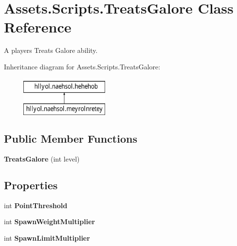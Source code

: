 \hypertarget{class_assets_1_1_scripts_1_1_treats_galore}{}\section{Assets.\+Scripts.\+Treats\+Galore Class Reference}
\label{class_assets_1_1_scripts_1_1_treats_galore}


A player\textquotesingle{}s Treats Galore ability.  


Inheritance diagram for Assets.\+Scripts.\+Treats\+Galore\+:\begin{figure}[H]
\begin{center}
\leavevmode
\includegraphics[height=2.000000cm]{class_assets_1_1_scripts_1_1_treats_galore}
\end{center}
\end{figure}
\subsection*{Public Member Functions}
\begin{DoxyCompactItemize}
\item 
{\bfseries Treats\+Galore} (int level)\hypertarget{class_assets_1_1_scripts_1_1_treats_galore_ab8b2acec90bade0247a277b8247e6511}{}\label{class_assets_1_1_scripts_1_1_treats_galore_ab8b2acec90bade0247a277b8247e6511}

\end{DoxyCompactItemize}
\subsection*{Properties}
\begin{DoxyCompactItemize}
\item 
int {\bfseries Point\+Threshold}\hypertarget{class_assets_1_1_scripts_1_1_treats_galore_a4bd2c09fe09456c87a9d0428d55f49a3}{}\label{class_assets_1_1_scripts_1_1_treats_galore_a4bd2c09fe09456c87a9d0428d55f49a3}

\item 
int {\bfseries Spawn\+Weight\+Multiplier}\hypertarget{class_assets_1_1_scripts_1_1_treats_galore_a342e9f77f4c23b1c226fedd43e1d1eea}{}\label{class_assets_1_1_scripts_1_1_treats_galore_a342e9f77f4c23b1c226fedd43e1d1eea}

\item 
int {\bfseries Spawn\+Limit\+Multiplier}\hypertarget{class_assets_1_1_scripts_1_1_treats_galore_a486debc5c5d83583d2bfafed93007c54}{}\label{class_assets_1_1_scripts_1_1_treats_galore_a486debc5c5d83583d2bfafed93007c54}

\end{DoxyCompactItemize}


